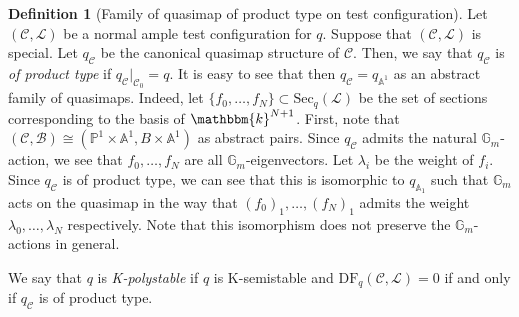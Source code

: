 \documentclass[12pt,twoside]{amsart}
\theoremstyle{definition}
\newtheorem{defn}[thm]{Definition}
\begin{document}
\begin{defn}[Family of quasimap of product type on test configuration]
 Let $(\mathcal{C},\mathcal{L})$ be a normal ample test configuration for $q$.  Suppose that $(\mathcal{C},\mathcal{L})$ is special.
 Let $q_{\mathcal{C}}$ be the canonical quasimap structure of $\mathcal{C}$. Then, we say that $q_{\mathcal{C}}$ is {\it of product type} if $q_{\mathcal{C}}|_{\mathcal{C}_0}=q$.
 It is easy to see that then $q_{\mathcal{C}}=q_{\mathbb{A}^1}$ as an abstract family of quasimaps. 
 Indeed, let $\{f_0,\ldots,f_N\}\subset\mathrm{Sec}_q(\mathscr{L})$ be the set of sections corresponding to the basis of $\mathbbm{k}^{N+1}$.
 First, note that $(\mathcal{C},\mathcal{B})\cong(\mathbb{P}^1\times\mathbb{A}^1,B\times\mathbb{A}^1)$ as abstract pairs.
 Since $q_{\mathcal{C}}$ admits the natural $\mathbb{G}_m$-action, we see that $f_0,\ldots,f_N$ are all $\mathbb{G}_m$-eigenvectors.
 Let $\lambda_i$ be the weight of $f_i$.
 Since $q_{\mathcal{C}}$ is of product type, we can see that this is isomorphic to $q_{\mathbb{A}_1}$ such that $\mathbb{G}_m$ acts on the quasimap in the way that $(f_0)_1,\ldots,(f_N)_1$ admits the weight $\lambda_0,\ldots,\lambda_N$ respectively.
 Note that this isomorphism does not preserve the $\mathbb{G}_m$-actions in general.
 

 We say that $q$ is {\it K-polystable} if $q$ is K-semistable and $\mathrm{DF}_q(\mathcal{C},\mathcal{L})=0$ if and only if $q_\mathcal{C}$ is of product type.
\end{defn}
\end{document}
